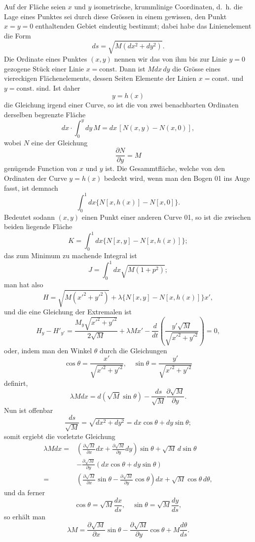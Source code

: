 \documentclass[11pt,a4paper,leqno]{article}
\begin{document}
Auf der Fläche seien $x$ und $y$ isometrische, krummlinige Coordinaten, d.~h. die Lage eines Punktes sei durch diese Grössen in einem gewissen, den Punkt $x=y=0$ enthaltenden Gebiet eindeutig bestimmt; dabei habe das Linienelement die Form
\[
ds=\sqrt{M(dx^2+dy^2)}.
\]
Die Ordinate eines Punktes $(x,y)$ nennen wir das von ihm bis zur Linie $y=0$ gezogene Stück einer Linie $x=\mathrm{const}$. Dann ist $Mdx\,dy$ die Grösse eines viereckigen Flächenelements, dessen Seiten Elemente der Linien $x=\mathrm{const}.$ und $y=\mathrm{const}.$ sind. Ist daher
\[
y=h(x)
\]
die Gleichung irgend einer Curve, so ist die von zwei benachbarten Ordinaten derselben begrenzte Fläche
\[
dx\cdot\int_0^ydy\,M=dx\,[N(x,y)-N(x,0)],
\]
wobei $N$ eine der Gleichung
\[
\frac{\partial N}{\partial y}=M
\]
genügende Function von $x$ und $y$ ist. Die Gesammtfläche, welche von den Ordinaten der Curve $y=h(x)$ bedeckt wird, wenn man den Bogen 01 ins Auge fasst, ist demnach
\[
\int_0^1dx\{N[x,h(x)]-N[x,0]\}.
\]
Bedeutet sodann $(x,y)$ einen Punkt einer anderen Curve 01, so ist die zwischen beiden liegende Fläche
\[
K=\int_0^1dx\{N[x,y]-N[x,h(x)]\};
\]
das zum Minimum zu machende Integral ist
\[
J=\int_0^1dx\sqrt{M(1+p^2)};
\]
man hat also
\[
H=\sqrt{M(x'^2+y'^2)}+\lambda\{N[x,y]-N[x,h(x)]\}x',
\]
und die eine Gleichung der Extremalen ist
\[
H_y-H'_{y'}=\frac{M_y\sqrt{x'^2+y'^2}}{2\sqrt{M}}+
\lambda Mx'-\frac{d}{dt}\left(\frac{y'\sqrt{M}}{\sqrt{x'^2+y'^2}}\right)=0,
\]
oder, indem man den Winkel $\theta$ durch die Gleichungen
\[
\cos\theta=\frac{x'}{\sqrt{x'^2+y'^2}},
\quad
\sin\theta=\frac{y'}{\sqrt{x'^2+y'^2}}
\]
definirt,
\[
\lambda Mdx=d(\sqrt{M}\sin\theta)-\frac{ds}{\sqrt{M}}\frac{\partial\sqrt{M}}{\partial y}.
\]
Nun ist offenbar
\[
\frac{ds}{\sqrt{M}}=\sqrt{dx^2+dy^2}=dx\cos\theta+dy\sin\theta;
\]
somit ergiebt die vorletzte Gleichung
\[
\begin{aligned}
\lambda Mdx={}&\left(\frac{\partial\sqrt{M}}{\partial x}dx+\frac{\partial\sqrt{M}}{\partial y}dy\right)\sin\theta
+\sqrt{M}\,d\sin\theta\\
&-\frac{\partial\sqrt{M}}{\partial y}(dx\cos\theta+dy\sin\theta)\\
={}&\left(\frac{\partial\sqrt{M}}{\partial x}\sin\theta-\frac{\partial\sqrt{M}}{\partial y}\cos\theta\right)dx+
\sqrt{M}\cos\theta\,d\theta,
\end{aligned}
\]
und da ferner
\[
\cos\theta=\sqrt{M}\frac{dx}{ds},
\quad
\sin\theta=\sqrt{M}\frac{dy}{ds},
\]
so erhält man
\[
\lambda M=\frac{\partial\sqrt{M}}{\partial x}\sin\theta-
\frac{\partial\sqrt{M}}{\partial y}\cos\theta+M\frac{d\theta}{ds}.
\]
\end{document}
